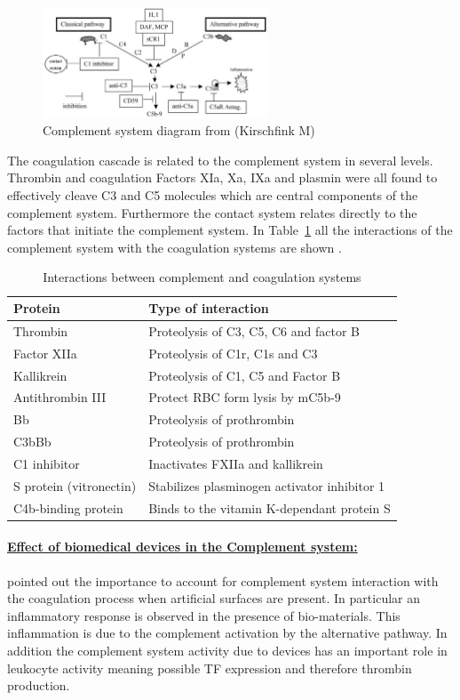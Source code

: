 \documentclass[%
 nofootinbib,
 amsmath,amssymb,
 aps,
 pra,
]{revtex4-1}
\begin{document}
\begin{figure}[h]
\includegraphics[width=0.6\textwidth]{Figures/contactsystem.png}
\caption{\label{diag:complement} Complement system diagram from \cite{Gorbet:2004} (Kirschfink M)}
\end{figure}
The coagulation cascade is related to the complement system in several levels. Thrombin and coagulation Factors XIa, Xa, IXa and plasmin were all found to effectively cleave C3 and C5 molecules which are central components of the complement system. Furthermore the contact system relates directly to the factors that initiate the complement system.  In Table~\ref{tab:comple} all the interactions of the complement system with the coagulation systems are shown \citep{Gorbet:2004}.\\
\begin{table}[h]
\begin{tabular}{l l}
\hline
Protein & Type of interaction \\
\hline
Thrombin & Proteolysis of C3, C5, C6 and factor B\\
Factor XIIa & Proteolysis of C1r, C1s and C3\\
Kallikrein & Proteolysis of C1, C5 and Factor B \\
Antithrombin III & Protect RBC form lysis by mC5b-9\\
Bb & Proteolysis of prothrombin \\
C3bBb & Proteolysis of prothrombin \\
C1 inhibitor & Inactivates FXIIa and kallikrein \\
S protein (vitronectin) & Stabilizes plasminogen activator inhibitor 1 \\
C4b-binding protein & Binds to the vitamin K-dependant protein S \\
\hline
\end{tabular}
\caption{\label{tab:comple}Interactions between complement and coagulation systems \cite{Gorbet:2004}}
\end{table}
\paragraph{\underline{Effect of biomedical devices in the Complement system:}}
\citet{Gorbet:2004} pointed out the importance to account for complement system interaction with the coagulation process when artificial surfaces are present. In particular an inflammatory response is observed in the presence of bio-materials. This inflammation is due to the complement activation by the alternative pathway. In addition the complement system activity due to devices has an important role in leukocyte activity meaning possible TF expression and therefore thrombin production.
\end{document}
